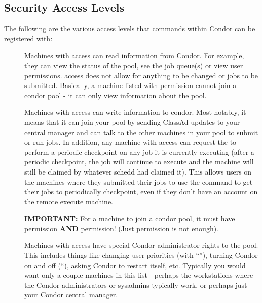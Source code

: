 \subsection{\label{sec:Security-Access-Levels}Security Access Levels} 

The following are the various access levels that commands within
Condor can be registered with:

\begin{description}

\item[] \label{dcperm:read} Machines with 
   access can read information from Condor.  For example, they can
   view the status of the pool, see the job queue(s) or view user
   permissions.   access does not allow for anything to
   be changed or jobs to be submitted.  Basically, a machine listed
   with  permission cannot join a condor pool - it can
   only view information about the pool.

\item[] \label{dcperm:write} Machines with
    access can write information to condor.  Most
   notably, it means that it can join your pool by sending ClassAd
   updates to your central manager and can talk to the other machines
   in your pool to submit or run jobs.  In addition, any machine with
    access can request the  to perform a
   periodic checkpoint on any job it is currently executing (after a
   periodic checkpoint, the job will continue to execute and the
   machine will still be claimed by whatever schedd had claimed it).
   This allows users on the machines where they submitted their jobs
   to use the  command to get their jobs to
   periodically checkpoint, even if they don't have an account on the
   remote execute machine.

   \textbf{IMPORTANT:} For a machine to join a condor pool, it must
   have  permission \textbf{AND}  permission!
   (Just  permission is not enough).

\item[] \label{dcperm:administrator} Machines
   with  access have special Condor
   administrator rights to the pool.  This includes things like
   changing user priorities (with ``''), turning
   Condor on and off (``), asking Condor to
   restart itself, etc.  Typically you would want only
   a couple machines in this list - perhaps the workstations where the
   Condor administrators or sysadmins typically work, or perhaps just
   your Condor central manager.


\end{description}
